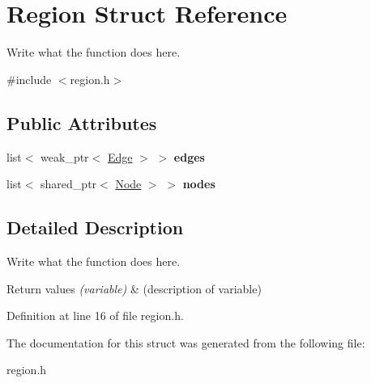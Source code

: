 \hypertarget{structRegion}{\section{Region Struct Reference}
\label{structRegion}
}


Write what the function does here.  




{\ttfamily \#include $<$region.\+h$>$}

\subsection*{Public Attributes}
\begin{DoxyCompactItemize}
\item 
\hypertarget{structRegion_a98be146388a90c0c42ab2d8ba2dd1804}{list$<$ weak\+\_\+ptr$<$ \hyperlink{structEdge}{Edge} $>$ $>$ {\bfseries edges}}\label{structRegion_a98be146388a90c0c42ab2d8ba2dd1804}

\item 
\hypertarget{structRegion_a8a56abfa456673273c9f9f8138c68bdf}{list$<$ shared\+\_\+ptr$<$ \hyperlink{classNode}{Node} $>$ $>$ {\bfseries nodes}}\label{structRegion_a8a56abfa456673273c9f9f8138c68bdf}

\end{DoxyCompactItemize}


\subsection{Detailed Description}
Write what the function does here. 


\begin{DoxyRetVals}{Return values}
{\em (variable)} & (description of variable) \\
\hline
\end{DoxyRetVals}


Definition at line 16 of file region.\+h.



The documentation for this struct was generated from the following file\+:\begin{DoxyCompactItemize}
\item 
region.\+h\end{DoxyCompactItemize}

